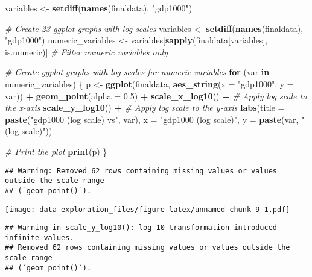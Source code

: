 \documentclass[
]{article}
\newenvironment{Shaded}{\begin{snugshade}}{\end{snugshade}}
\newcommand{\AttributeTok}[1]{\textcolor[rgb]{0.13,0.29,0.53}{#1}}
\newcommand{\CommentTok}[1]{\textcolor[rgb]{0.56,0.35,0.01}{\textit{#1}}}
\newcommand{\ControlFlowTok}[1]{\textcolor[rgb]{0.13,0.29,0.53}{\textbf{#1}}}
\newcommand{\FloatTok}[1]{\textcolor[rgb]{0.00,0.00,0.81}{#1}}
\newcommand{\FunctionTok}[1]{\textcolor[rgb]{0.13,0.29,0.53}{\textbf{#1}}}
\newcommand{\NormalTok}[1]{#1}
\newcommand{\OtherTok}[1]{\textcolor[rgb]{0.56,0.35,0.01}{#1}}
\newcommand{\SpecialCharTok}[1]{\textcolor[rgb]{0.81,0.36,0.00}{\textbf{#1}}}
\newcommand{\StringTok}[1]{\textcolor[rgb]{0.31,0.60,0.02}{#1}}
\begin{document}
\begin{Shaded}
\begin{Highlighting}[]
\NormalTok{variables }\OtherTok{\textless{}{-}} \FunctionTok{setdiff}\NormalTok{(}\FunctionTok{names}\NormalTok{(finaldata), }\StringTok{"gdp1000"}\NormalTok{)}

\CommentTok{\# Create 23 ggplot graphs with log scales}
\NormalTok{variables }\OtherTok{\textless{}{-}} \FunctionTok{setdiff}\NormalTok{(}\FunctionTok{names}\NormalTok{(finaldata), }\StringTok{"gdp1000"}\NormalTok{)}
\NormalTok{numeric\_variables }\OtherTok{\textless{}{-}}\NormalTok{ variables[}\FunctionTok{sapply}\NormalTok{(finaldata[variables], is.numeric)]  }\CommentTok{\# Filter numeric variables only}

\CommentTok{\# Create ggplot graphs with log scales for numeric variables}
\ControlFlowTok{for}\NormalTok{ (var }\ControlFlowTok{in}\NormalTok{ numeric\_variables) \{}
\NormalTok{  p }\OtherTok{\textless{}{-}} \FunctionTok{ggplot}\NormalTok{(finaldata, }\FunctionTok{aes\_string}\NormalTok{(}\AttributeTok{x =} \StringTok{"gdp1000"}\NormalTok{, }\AttributeTok{y =}\NormalTok{ var)) }\SpecialCharTok{+}
    \FunctionTok{geom\_point}\NormalTok{(}\AttributeTok{alpha =} \FloatTok{0.5}\NormalTok{) }\SpecialCharTok{+}
    \FunctionTok{scale\_x\_log10}\NormalTok{() }\SpecialCharTok{+}  \CommentTok{\# Apply log scale to the x{-}axis}
    \FunctionTok{scale\_y\_log10}\NormalTok{() }\SpecialCharTok{+}  \CommentTok{\# Apply log scale to the y{-}axis}
    \FunctionTok{labs}\NormalTok{(}\AttributeTok{title =} \FunctionTok{paste}\NormalTok{(}\StringTok{"gdp1000 (log scale) vs"}\NormalTok{, var), }\AttributeTok{x =} \StringTok{"gdp1000 (log scale)"}\NormalTok{, }\AttributeTok{y =} \FunctionTok{paste}\NormalTok{(var, }\StringTok{"(log scale)"}\NormalTok{))}

  \CommentTok{\# Print the plot}
  \FunctionTok{print}\NormalTok{(p)}
\NormalTok{\}}
\end{Highlighting}
\end{Shaded}

\begin{verbatim}
## Warning: Removed 62 rows containing missing values or values outside the scale range
## (`geom_point()`).
\end{verbatim}

\texttt{[image: data-exploration\_files/figure-latex/unnamed-chunk-9-1.pdf]}

\begin{verbatim}
## Warning in scale_y_log10(): log-10 transformation introduced infinite values.
## Removed 62 rows containing missing values or values outside the scale range
## (`geom_point()`).
\end{verbatim}
\end{document}
